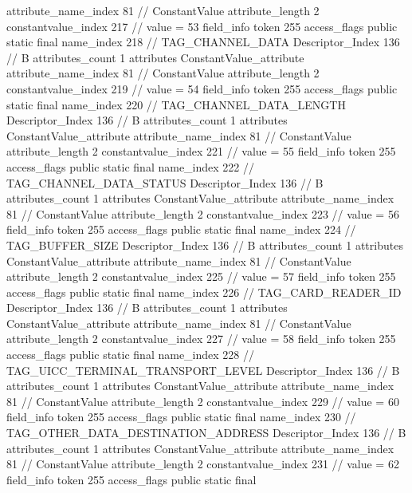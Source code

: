 {{{{{{{					attribute_name_index	81		// ConstantValue
					attribute_length	2
					constantvalue_index	217		// value = 53
				}
				}
			}
			field_info {
				token	255
				access_flags	public static final
				name_index	218		// TAG_CHANNEL_DATA
				Descriptor_Index	136		// B
				attributes_count	1
				attributes {
				ConstantValue_attribute {
					attribute_name_index	81		// ConstantValue
					attribute_length	2
					constantvalue_index	219		// value = 54
				}
				}
			}
			field_info {
				token	255
				access_flags	public static final
				name_index	220		// TAG_CHANNEL_DATA_LENGTH
				Descriptor_Index	136		// B
				attributes_count	1
				attributes {
				ConstantValue_attribute {
					attribute_name_index	81		// ConstantValue
					attribute_length	2
					constantvalue_index	221		// value = 55
				}
				}
			}
			field_info {
				token	255
				access_flags	public static final
				name_index	222		// TAG_CHANNEL_DATA_STATUS
				Descriptor_Index	136		// B
				attributes_count	1
				attributes {
				ConstantValue_attribute {
					attribute_name_index	81		// ConstantValue
					attribute_length	2
					constantvalue_index	223		// value = 56
				}
				}
			}
			field_info {
				token	255
				access_flags	public static final
				name_index	224		// TAG_BUFFER_SIZE
				Descriptor_Index	136		// B
				attributes_count	1
				attributes {
				ConstantValue_attribute {
					attribute_name_index	81		// ConstantValue
					attribute_length	2
					constantvalue_index	225		// value = 57
				}
				}
			}
			field_info {
				token	255
				access_flags	public static final
				name_index	226		// TAG_CARD_READER_ID
				Descriptor_Index	136		// B
				attributes_count	1
				attributes {
				ConstantValue_attribute {
					attribute_name_index	81		// ConstantValue
					attribute_length	2
					constantvalue_index	227		// value = 58
				}
				}
			}
			field_info {
				token	255
				access_flags	public static final
				name_index	228		// TAG_UICC_TERMINAL_TRANSPORT_LEVEL
				Descriptor_Index	136		// B
				attributes_count	1
				attributes {
				ConstantValue_attribute {
					attribute_name_index	81		// ConstantValue
					attribute_length	2
					constantvalue_index	229		// value = 60
				}
				}
			}
			field_info {
				token	255
				access_flags	public static final
				name_index	230		// TAG_OTHER_DATA_DESTINATION_ADDRESS
				Descriptor_Index	136		// B
				attributes_count	1
				attributes {
				ConstantValue_attribute {
					attribute_name_index	81		// ConstantValue
					attribute_length	2
					constantvalue_index	231		// value = 62
				}
				}
			}
			field_info {
				token	255
				access_flags	public static final
}}}}}

